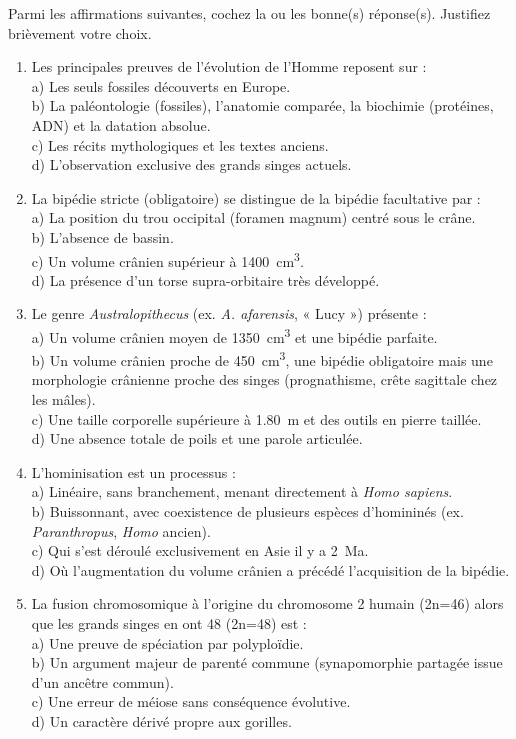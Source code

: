 \documentclass[11pt]{article}
\begin{document}
\begin{exercice}
Parmi les affirmations suivantes, cochez la ou les bonne(s) réponse(s). Justifiez brièvement votre choix.
\begin{enumerate}
    \item Les principales preuves de l'évolution de l'Homme reposent sur :\\
    a) Les seuls fossiles découverts en Europe.\\
    b) La paléontologie (fossiles), l'anatomie comparée, la biochimie (protéines, ADN) et la datation absolue.\\
    c) Les récits mythologiques et les textes anciens.\\
    d) L'observation exclusive des grands singes actuels.
    \item La bipédie stricte (obligatoire) se distingue de la bipédie facultative par :\\
    a) La position du trou occipital (foramen magnum) centré sous le crâne.\\
    b) L'absence de bassin.\\
    c) Un volume crânien supérieur à \SI{1400}{cm^3}.\\
    d) La présence d'un torse supra-orbitaire très développé.
    \item Le genre \emph{Australopithecus} (ex. \emph{A. afarensis}, « Lucy ») présente :\\
    a) Un volume crânien moyen de \SI{1350}{cm^3} et une bipédie parfaite.\\
    b) Un volume crânien proche de \SI{450}{cm^3}, une bipédie obligatoire mais une morphologie crânienne proche des singes (prognathisme, crête sagittale chez les mâles).\\
    c) Une taille corporelle supérieure à \SI{1,80}{m} et des outils en pierre taillée.\\
    d) Une absence totale de poils et une parole articulée.
    \item L'hominisation est un processus :\\
    a) Linéaire, sans branchement, menant directement à \emph{Homo sapiens}.\\
    b) Buissonnant, avec coexistence de plusieurs espèces d'homininés (ex. \emph{Paranthropus}, \emph{Homo} ancien).\\
    c) Qui s'est déroulé exclusivement en Asie il y a \SI{2}{Ma}.\\
    d) Où l'augmentation du volume crânien a précédé l'acquisition de la bipédie.
    \item La fusion chromosomique à l'origine du chromosome 2 humain (2n=46) alors que les grands singes en ont 48 (2n=48) est :\\
    a) Une preuve de spéciation par polyploïdie.\\
    b) Un argument majeur de parenté commune (synapomorphie partagée issue d'un ancêtre commun).\\
    c) Une erreur de méiose sans conséquence évolutive.\\
    d) Un caractère dérivé propre aux gorilles.
\end{enumerate}
\end{exercice}
\end{document}
